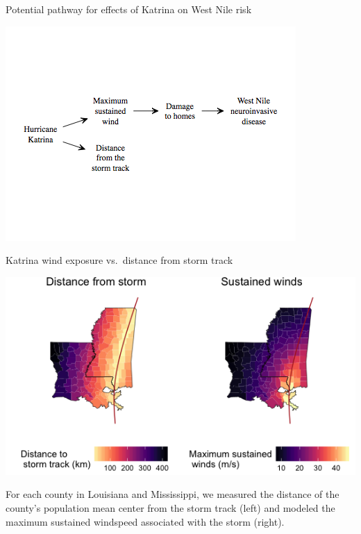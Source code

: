 \documentclass[ignorenonframetext,]{beamer}
\begin{document}
\begin{frame}{Potential pathway for effects of Katrina on West Nile
risk}

\begin{center}\includegraphics[width=\textwidth]{figures/causal_wind} \end{center}

\end{frame}

\begin{frame}{Katrina wind exposure vs.~distance from storm track}

\begin{center}\includegraphics[width=\textwidth]{figures/katrina_continuous_exposures} \end{center}

\footnotesize For each county in Louisiana and Mississippi, we measured
the distance of the county's population mean center from the storm track
(left) and modeled the maximum sustained windspeed associated with the
storm (right).

\end{frame}
\end{document}
